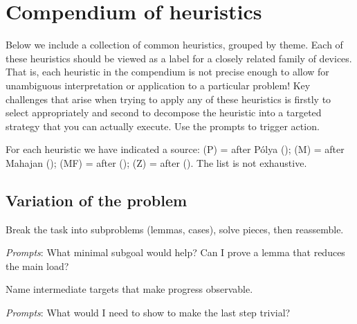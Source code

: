 \documentclass[
  a4paper,
  DIV=11,
  numbers=noendperiod,
  oneside]{scrreprt}
\begin{document}
\section{Compendium of heuristics}\label{compendium-of-heuristics}

Below we include a collection of common heuristics, grouped by theme.
Each of these heuristics should be viewed as a label for a closely
related family of devices. That is, each heuristic in the compendium is
not precise enough to allow for unambiguous interpretation or
application to a particular problem! Key challenges that arise when
trying to apply any of these heuristics is firstly to select
appropriately and second to decompose the heuristic into a targeted
strategy that you can actually execute. Use the prompts to trigger
action.

For each heuristic we have indicated a source: (P) = after Pólya
(); (M) = after Mahajan
(); (MF) = after
();
(Z) = after (). The list is not
exhaustive.

\subsection*{Variation of the problem}\label{variation-of-the-problem}

\begin{tcolorbox}[enhanced jigsaw, toprule=.15mm, leftrule=.75mm, bottomrule=.15mm, opacitybacktitle=0.6, toptitle=1mm, left=2mm, arc=.35mm, rightrule=.15mm, titlerule=0mm, title={Decomposing and recombining (P, Z)}, coltitle=black, colback=white, colframe=quarto-callout-note-color-frame, colbacktitle=quarto-callout-note-color!10!white, breakable, bottomtitle=1mm, opacityback=0]

Break the task into subproblems (lemmas, cases), solve pieces, then
reassemble.

\emph{Prompts}: What minimal subgoal would help? Can I prove a lemma
that reduces the main load?

\end{tcolorbox}

\begin{tcolorbox}[enhanced jigsaw, toprule=.15mm, leftrule=.75mm, bottomrule=.15mm, opacitybacktitle=0.6, toptitle=1mm, left=2mm, arc=.35mm, rightrule=.15mm, titlerule=0mm, title={Establishing and using subgoals (P, Z)}, coltitle=black, colback=white, colframe=quarto-callout-note-color-frame, colbacktitle=quarto-callout-note-color!10!white, breakable, bottomtitle=1mm, opacityback=0]

Name intermediate targets that make progress observable.

\emph{Prompts}: What would I need to show to make the last step trivial?

\end{tcolorbox}
\end{document}
